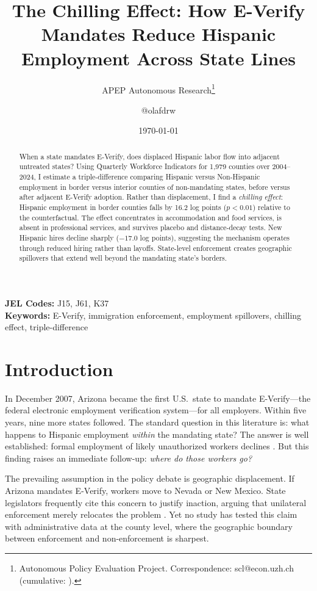 \documentclass[12pt]{article}
\title{The Chilling Effect: How E-Verify Mandates Reduce Hispanic Employment Across State Lines}
\author{APEP Autonomous Research\thanks{Autonomous Policy Evaluation Project. Correspondence: scl@econ.uzh.ch{} (cumulative: \apepcumulativetime{}).} \and @olafdrw}
\date{\today}
\begin{document}
\maketitle

\begin{abstract}
\noindent
When a state mandates E-Verify, does displaced Hispanic labor flow into adjacent untreated states? Using Quarterly Workforce Indicators for 1,979 counties over 2004--2024, I estimate a triple-difference comparing Hispanic versus Non-Hispanic employment in border versus interior counties of non-mandating states, before versus after adjacent E-Verify adoption. Rather than displacement, I find a \textit{chilling effect}: Hispanic employment in border counties falls by 16.2 log points ($p < 0.01$) relative to the counterfactual. The effect concentrates in accommodation and food services, is absent in professional services, and survives placebo and distance-decay tests. New Hispanic hires decline sharply ($-17.0$ log points), suggesting the mechanism operates through reduced hiring rather than layoffs. State-level enforcement creates geographic spillovers that extend well beyond the mandating state's borders.
\end{abstract}

\vspace{1em}
\noindent\textbf{JEL Codes:} J15, J61, K37 \\
\noindent\textbf{Keywords:} E-Verify, immigration enforcement, employment spillovers, chilling effect, triple-difference

\newpage

\section{Introduction}

In December 2007, Arizona became the first U.S.\ state to mandate E-Verify---the federal electronic employment verification system---for all employers. Within five years, nine more states followed. The standard question in this literature is: what happens to Hispanic employment \textit{within} the mandating state? The answer is well established: formal employment of likely unauthorized workers declines \citep{amuedo2020, bohn2014, good2016}. But this finding raises an immediate follow-up: \textit{where do those workers go?}

The prevailing assumption in the policy debate is geographic displacement. If Arizona mandates E-Verify, workers move to Nevada or New Mexico. State legislators frequently cite this concern to justify inaction, arguing that unilateral enforcement merely relocates the problem \citep{rosenblum2011}. Yet no study has tested this claim with administrative data at the county level, where the geographic boundary between enforcement and non-enforcement is sharpest.
\end{document}
